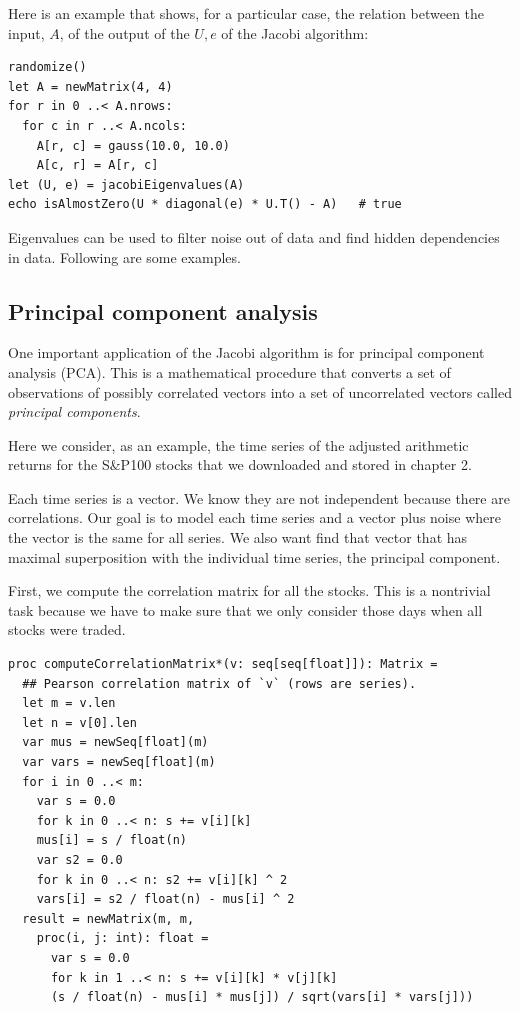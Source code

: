 \documentclass[justified, sixbynine]{tufte-book}
\def\ft{\small\tt}
\theoremstyle{plain}%
\newtheorem * {corollary}{Corollary}
\theoremstyle{definition}
\theoremstyle{remark}
\newtheorem * {remark}{Remark}
\newtheorem * {note}{Note}
\begin{document}
\begin{fullwidth}
Here is an example that shows, for a particular case, the relation between the input, $A$, of the output of the $U, e$ of the Jacobi algorithm:

\begin{lstlisting}
randomize()
let A = newMatrix(4, 4)
for r in 0 ..< A.nrows:
  for c in r ..< A.ncols:
    A[r, c] = gauss(10.0, 10.0)
    A[c, r] = A[r, c]
let (U, e) = jacobiEigenvalues(A)
echo isAlmostZero(U * diagonal(e) * U.T() - A)   # true
\end{lstlisting}

Eigenvalues can be used to filter noise out of data and find hidden dependencies in data. Following are some examples.

\goodbreak\subsection{Principal component analysis}


One important application of the Jacobi algorithm is for principal component analysis (PCA). This is a mathematical procedure that converts a set of observations of possibly correlated vectors into a set of uncorrelated vectors called {\it principal components}.

Here we consider, as an example, the time series of the adjusted arithmetic returns for the S\&P100 stocks that we downloaded and stored in chapter 2.

Each time series is a vector. We know they are not independent because there are correlations. Our goal is to model each time series and a vector plus noise where the vector is the same for all series. We also want find that vector that has maximal superposition with the individual time series, the principal component.

First, we compute the correlation matrix for all the stocks. This is a nontrivial task because we have to make sure that we only consider those days when all stocks were traded. %


\begin{lstlisting}[caption={in file: {\ft nlib/linalg.nim}}]
proc computeCorrelationMatrix*(v: seq[seq[float]]): Matrix =
  ## Pearson correlation matrix of `v` (rows are series).
  let m = v.len
  let n = v[0].len
  var mus = newSeq[float](m)
  var vars = newSeq[float](m)
  for i in 0 ..< m:
    var s = 0.0
    for k in 0 ..< n: s += v[i][k]
    mus[i] = s / float(n)
    var s2 = 0.0
    for k in 0 ..< n: s2 += v[i][k] ^ 2
    vars[i] = s2 / float(n) - mus[i] ^ 2
  result = newMatrix(m, m,
    proc(i, j: int): float =
      var s = 0.0
      for k in 1 ..< n: s += v[i][k] * v[j][k]
      (s / float(n) - mus[i] * mus[j]) / sqrt(vars[i] * vars[j]))
\end{lstlisting}


\end{fullwidth}
\end{document}
